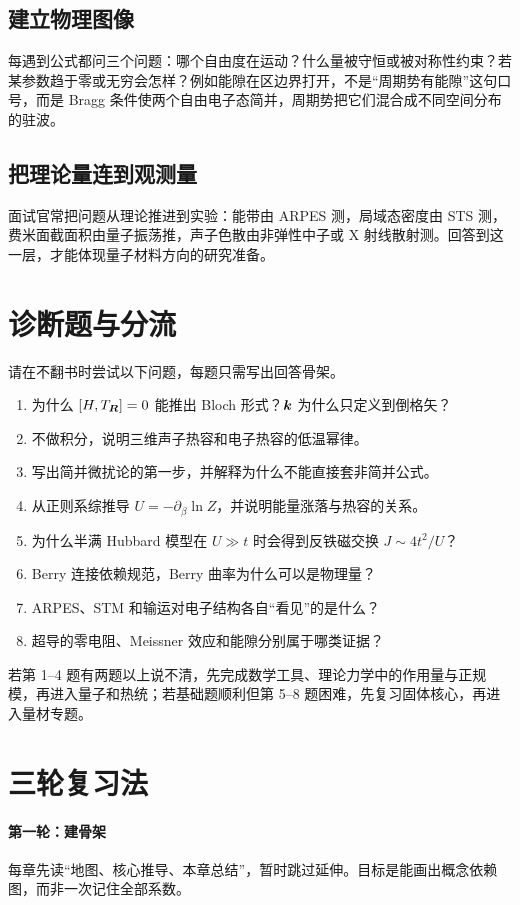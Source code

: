 \subsection{建立物理图像}
每遇到公式都问三个问题：哪个自由度在运动？什么量被守恒或被对称性约束？若某参数趋于零或无穷会怎样？例如能隙在区边界打开，不是“周期势有能隙”这句口号，而是 Bragg 条件使两个自由电子态简并，周期势把它们混合成不同空间分布的驻波。

\subsection{把理论量连到观测量}
面试官常把问题从理论推进到实验：能带由 ARPES 测，局域态密度由 STS 测，费米面截面积由量子振荡推，声子色散由非弹性中子或 X 射线散射测。回答到这一层，才能体现量子材料方向的研究准备。

\section{诊断题与分流}
请在不翻书时尝试以下问题，每题只需写出回答骨架。
\begin{selftestbox}
\begin{enumerate}
\item 为什么 $[H,T_{\bm{R}}]=0$ 能推出 Bloch 形式？$\bm{k}$ 为什么只定义到倒格矢？
\item 不做积分，说明三维声子热容和电子热容的低温幂律。
\item 写出简并微扰论的第一步，并解释为什么不能直接套非简并公式。
\item 从正则系综推导 $U=-\partial_\beta\ln Z$，并说明能量涨落与热容的关系。
\item 为什么半满 Hubbard 模型在 $U\gg t$ 时会得到反铁磁交换 $J\sim4t^2/U$？
\item Berry 连接依赖规范，Berry 曲率为什么可以是物理量？
\item ARPES、STM 和输运对电子结构各自“看见”的是什么？
\item 超导的零电阻、Meissner 效应和能隙分别属于哪类证据？
\end{enumerate}
\end{selftestbox}
若第 1--4 题有两题以上说不清，先完成数学工具、理论力学中的作用量与正规模，再进入量子和热统；若基础题顺利但第 5--8 题困难，先复习固体核心，再进入量材专题。

\section{三轮复习法}
\paragraph{第一轮：建骨架}
每章先读“地图、核心推导、本章总结”，暂时跳过延伸。目标是能画出概念依赖图，而非一次记住全部系数。

